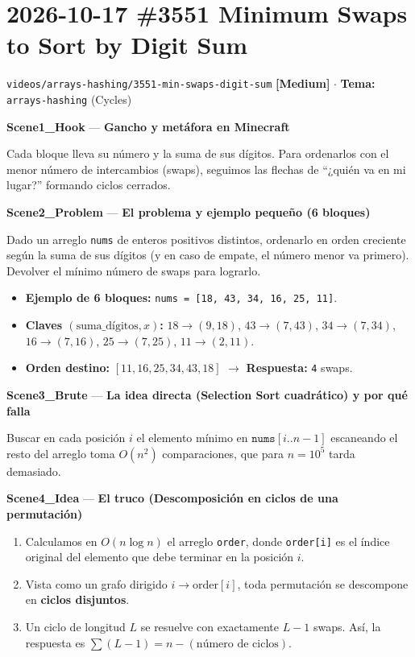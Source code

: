 \documentclass[letterpaper,10pt]{article}
\newcommand{\scene}[2]{\noindent\textbf{\textcolor{mcaqua}{#1}} --- \textbf{#2}\par\vspace{1pt}}
\newcommand{\folder}[1]{\texttt{\textcolor{mcgreen}{#1}}}
\newcommand{\badge}[2]{\textbf{\textcolor{#1}{[#2]}}}
\begin{document}
\newpage

\section{2026-10-17 \textbar{} \#3551 Minimum Swaps to Sort by Digit Sum}
\folder{videos/arrays-hashing/3551-min-swaps-digit-sum} \hfill \badge{mcgold}{Medium} $\cdot$ \textbf{Tema:} \texttt{arrays-hashing} (Cycles)

\begin{shaded}
\scene{Scene1\_Hook}{Gancho y met\'afora en Minecraft}
Cada bloque lleva su n\'umero y la suma de sus d\'igitos. Para ordenarlos con el menor n\'umero de intercambios (swaps), seguimos las flechas de ``¿qui\'en va en mi lugar?'' formando ciclos cerrados.

\scene{Scene2\_Problem}{El problema y ejemplo peque\~no (6 bloques)}
Dado un arreglo \texttt{nums} de enteros positivos distintos, ordenarlo en orden creciente seg\'un la suma de sus d\'igitos (y en caso de empate, el n\'umero menor va primero). Devolver el m\'inimo n\'umero de swaps para lograrlo.
\begin{itemize}\setlength{\itemsep}{1pt}
  \item \textbf{Ejemplo de 6 bloques:} \texttt{nums = [18, 43, 34, 16, 25, 11]}.
  \item \textbf{Claves $(\text{suma\_d\'igitos}, x)$:} $18 \to (9,18)$, $43 \to (7,43)$, $34 \to (7,34)$, $16 \to (7,16)$, $25 \to (7,25)$, $11 \to (2,11)$.
  \item \textbf{Orden destino:} $[11, 16, 25, 34, 43, 18]$ $\to$ \textbf{Respuesta:} \texttt{4} swaps.
\end{itemize}

\scene{Scene3\_Brute}{La idea directa (Selection Sort cuadr\'atico) y por qu\'e falla}
Buscar en cada posici\'on $i$ el elemento m\'inimo en $\texttt{nums}[i..n-1]$ escaneando el resto del arreglo toma $O(n^2)$ comparaciones, que para $n = 10^5$ tarda demasiado.

\scene{Scene4\_Idea}{El truco (Descomposici\'on en ciclos de una permutaci\'on)}
\begin{enumerate}\setlength{\itemsep}{1pt}
  \item Calculamos en $O(n \log n)$ el arreglo \texttt{order}, donde \texttt{order[i]} es el \'indice original del elemento que debe terminar en la posici\'on $i$.
  \item Vista como un grafo dirigido $i \to \text{order}[i]$, toda permutaci\'on se descompone en \textbf{ciclos disjuntos}.
  \item Un ciclo de longitud $L$ se resuelve con exactamente $L - 1$ swaps. As\'i, la respuesta es $\sum (L - 1) = n - (\text{n\'umero de ciclos})$.
\end{enumerate}


\end{shaded}
\end{document}
